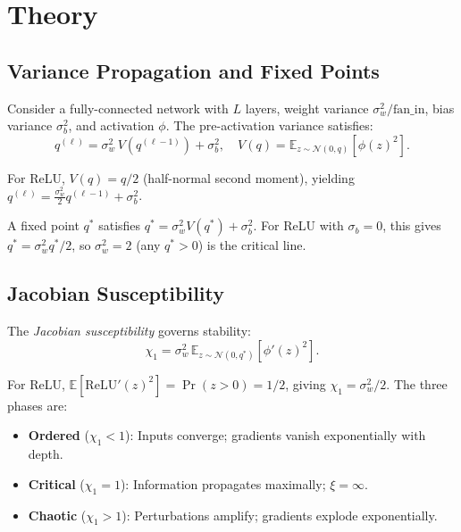\documentclass[10pt]{article}
\theoremstyle{definition}
\begin{document}
\section{Theory}
\label{sec:theory}

\subsection{Variance Propagation and Fixed Points}

Consider a fully-connected network with $L$ layers, weight variance $\sigma_w^2/\text{fan\_in}$, bias variance $\sigma_b^2$, and activation $\phi$.
The pre-activation variance satisfies:
\begin{equation}
  q^{(\ell)} = \sigma_w^2 \, V\!\left(q^{(\ell-1)}\right) + \sigma_b^2,
  \quad V(q) = \mathbb{E}_{z \sim \mathcal{N}(0,q)}[\phi(z)^2].
  \label{eq:variance}
\end{equation}

For ReLU, $V(q) = q/2$ (half-normal second moment), yielding $q^{(\ell)} = \frac{\sigma_w^2}{2} q^{(\ell-1)} + \sigma_b^2$.

A fixed point $q^*$ satisfies $q^* = \sigma_w^2 V(q^*) + \sigma_b^2$.
For ReLU with $\sigma_b = 0$, this gives $q^* = \sigma_w^2 q^*/2$, so $\sigma_w^2 = 2$ (any $q^* > 0$) is the critical line.

\subsection{Jacobian Susceptibility}

The \emph{Jacobian susceptibility} governs stability:
\begin{equation}
  \chi_1 = \sigma_w^2 \, \mathbb{E}_{z \sim \mathcal{N}(0, q^*)}[\phi'(z)^2].
  \label{eq:chi1}
\end{equation}

For ReLU, $\mathbb{E}[\text{ReLU}'(z)^2] = \Pr(z > 0) = 1/2$, giving $\chi_1 = \sigma_w^2/2$.
The three phases are:
\begin{itemize}[nosep]
  \item \textbf{Ordered} ($\chi_1 < 1$): Inputs converge; gradients vanish exponentially with depth.
  \item \textbf{Critical} ($\chi_1 = 1$): Information propagates maximally; $\xi = \infty$.
  \item \textbf{Chaotic} ($\chi_1 > 1$): Perturbations amplify; gradients explode exponentially.
\end{itemize}
\end{document}
